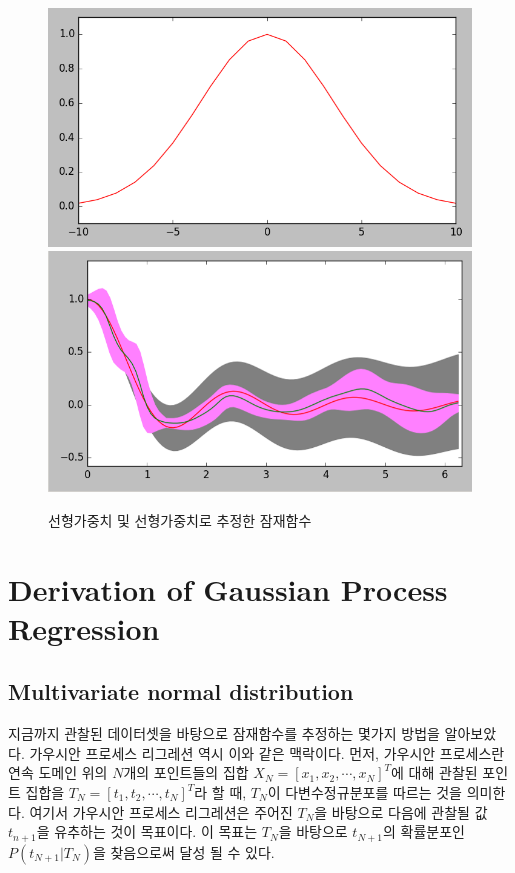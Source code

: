 \documentclass[a4paper]{oblivoir}
\begin{document}
\begin{figure}[ht] \centering
\centering
\includegraphics[scale=0.30]{fig12_25.png}\hspace{0.1cm}\includegraphics[scale=0.30]{fig12_13.png}
\caption{선형가중치 및 선형가중치로 추정한 잠재함수}
\label{fig:12-13}
\end{figure}

\section{Derivation of Gaussian Process Regression}

\subsection{Multivariate normal distribution}

지금까지 관찰된 데이터셋을 바탕으로 잠재함수를 추정하는 몇가지 방법을 알아보았다. 가우시안 프로세스 리그레션 역시 이와 같은 맥락이다. 먼저, 가우시안 프로세스란 연속 도메인 위의 $N$개의 포인트들의 집합 $X_{N} = [x_{1},x_{2}, \cdots , x_{N}]^{T}$에 대해 관찰된 포인트 집합을 $T_{N} = [t_{1},t_{2}, \cdots , t_{N}]^{T}$라 할 때, $T_{N}$이 다변수정규분포를 따르는 것을 의미한다. 여기서 가우시안 프로세스 리그레션은 주어진 $T_{N}$을 바탕으로 다음에 관찰될 값  $t_{n+1}$을 유추하는 것이 목표이다. 이 목표는 $T_{N}$을 바탕으로 $t_{N+1}$의 확률분포인 $P(t_{N+1}|T_{N})$을 찾음으로써 달성 될 수 있다.\\
\end{document}
